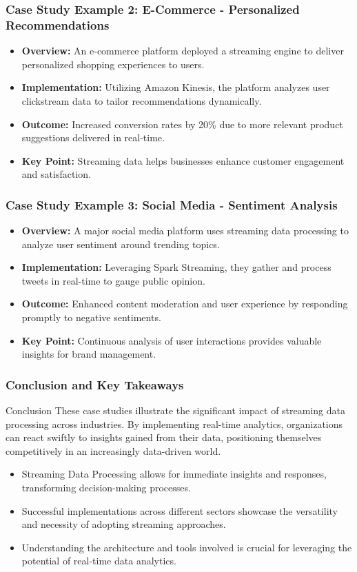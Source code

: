 \documentclass[aspectratio=169]{beamer}
\begin{document}
\begin{frame}[fragile]
    \frametitle{Case Study Example 2: E-Commerce - Personalized Recommendations}
    \begin{itemize}
        \item \textbf{Overview:} An e-commerce platform deployed a streaming engine to deliver personalized shopping experiences to users.
        \item \textbf{Implementation:} Utilizing Amazon Kinesis, the platform analyzes user clickstream data to tailor recommendations dynamically.
        \item \textbf{Outcome:} Increased conversion rates by 20\% due to more relevant product suggestions delivered in real-time.
        \item \textbf{Key Point:} Streaming data helps businesses enhance customer engagement and satisfaction.
    \end{itemize}
\end{frame}

\begin{frame}[fragile]
    \frametitle{Case Study Example 3: Social Media - Sentiment Analysis}
    \begin{itemize}
        \item \textbf{Overview:} A major social media platform uses streaming data processing to analyze user sentiment around trending topics.
        \item \textbf{Implementation:} Leveraging Spark Streaming, they gather and process tweets in real-time to gauge public opinion.
        \item \textbf{Outcome:} Enhanced content moderation and user experience by responding promptly to negative sentiments.
        \item \textbf{Key Point:} Continuous analysis of user interactions provides valuable insights for brand management.
    \end{itemize}
\end{frame}

\begin{frame}[fragile]
    \frametitle{Conclusion and Key Takeaways}
    \begin{block}{Conclusion}
        These case studies illustrate the significant impact of streaming data processing across industries. 
        By implementing real-time analytics, organizations can react swiftly to insights gained from their data, positioning themselves competitively in an increasingly data-driven world.
    \end{block}
    \begin{itemize}
        \item Streaming Data Processing allows for immediate insights and responses, transforming decision-making processes.
        \item Successful implementations across different sectors showcase the versatility and necessity of adopting streaming approaches.
        \item Understanding the architecture and tools involved is crucial for leveraging the potential of real-time data analytics.
    \end{itemize}
\end{frame}
\end{document}
